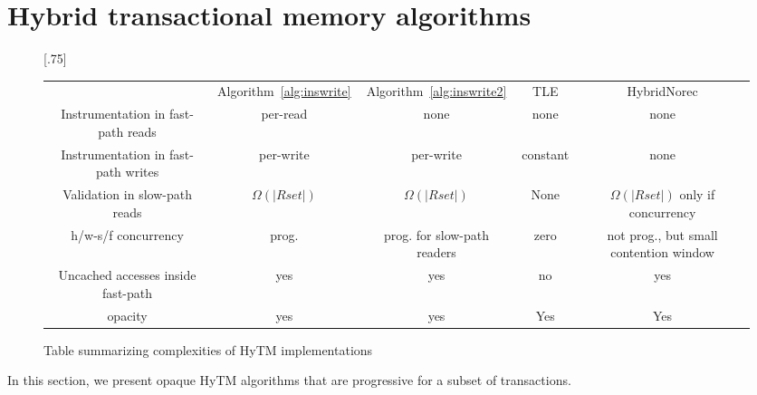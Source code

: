 \section{Hybrid transactional memory algorithms}\label{sec:hytmalgos}
%
\begin{figure*}[!t]
      
     \scalebox{.75}[.75]{
     \begin{tabularx}{\textwidth}{c|c|c|c|c}
	~~~~~ & Algorithm~\ref{alg:inswrite} & Algorithm~\ref{alg:inswrite2} & TLE & HybridNorec\\ 
	Instrumentation in fast-path reads & per-read & none & none & none \\ 
	Instrumentation in fast-path writes & per-write & per-write & constant & none \\ 
	Validation in slow-path reads & $\Omega(|Rset|)$ & $\Omega(|Rset|)$ & None & $\Omega(|Rset|)$ only if concurrency \\ 
	h/w-s/f concurrency & prog. & prog. for slow-path readers & zero & not prog., but small contention window \\ 
	Uncached accesses inside fast-path & yes & yes & no & yes \\ 
	opacity & yes & yes & Yes & Yes 
   \end{tabularx}
\caption{Table summarizing complexities of HyTM implementations}\label{fig:main}    
}
\end{figure*}
%
In this section, we present opaque HyTM algorithms that are progressive for a subset of transactions.
%

%
%